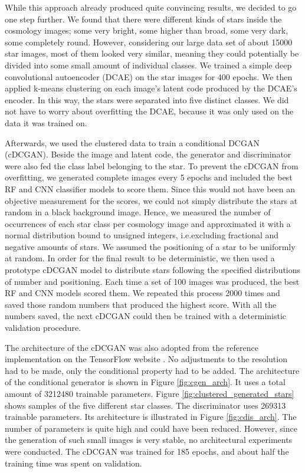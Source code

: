 \documentclass[10pt,conference,compsocconf]{IEEEtran}
\begin{document}
While this approach already produced quite convincing results, we decided to go one step further. We found that there were different kinds of stars inside the cosmology images; some very bright, some higher than broad, some very dark, some completely round. However, considering our large data set of about \SI{15000}{} star images, most of them looked very similar, meaning they could potentially be divided into some small amount of individual classes. We trained a simple deep convolutional autoencoder (DCAE) on the star images for 400 epochs. 
We then applied k-means clustering on each image's latent code produced by the DCAE's encoder. In this way, the stars were separated into five distinct classes. We did not have to worry about overfitting the DCAE, because it was only used on the data it was trained on.

Afterwards, we used the clustered data to train a conditional DCGAN (cDCGAN). Beside the image and latent code, the generator and discriminator were also fed the class label belonging to the star. To prevent the cDCGAN from overfitting, we generated complete images every 5 epochs and included the best RF and CNN classifier models to score them. Since this would not have been an objective measurement for the scores, we could not simply distribute the stars at random in a black background image.
Hence, we measured the number of occurrences of each star class per cosmology image and approximated it with a normal distribution bound to unsigned integers, i.e.\@ excluding fractional and negative amounts of stars. We assumed the positioning of a star to be uniformly at random. In order for the final result to be deterministic, we then used a prototype cDCGAN model to distribute stars following the specified distributions of number and positioning. Each time a set of \SI{100}{} images was produced, the best RF and CNN models scored them. We repeated this process \SI{2000}{} times and saved those random numbers that produced the highest score. With all the numbers saved, the next cDCGAN could then be trained with a deterministic validation procedure. 

The architecture of the cDCGAN was also adopted from the reference implementation on the TensorFlow website \cite{dcgantf}. No adjustments to the resolution had to be made, only the conditional property had to be added. The architecture of the conditional generator is shown in Figure \ref{fig:cgen_arch}. It uses a total amount of \SI{3212480}{} trainable parameters. Figure \ref{fig:clustered_generated_stars} shows samples of the five different star classes. The discriminator uses \SI{269313}{} trainable parameters. Its architecture is illustrated in Figure \ref{fig:cdis_arch}. The number of parameters is quite high and could have been reduced. However, since the generation of such small images is very stable, no architectural experiments were conducted. The cDCGAN was trained for 185 epochs, and about half the training time was spent on validation.
\end{document}
